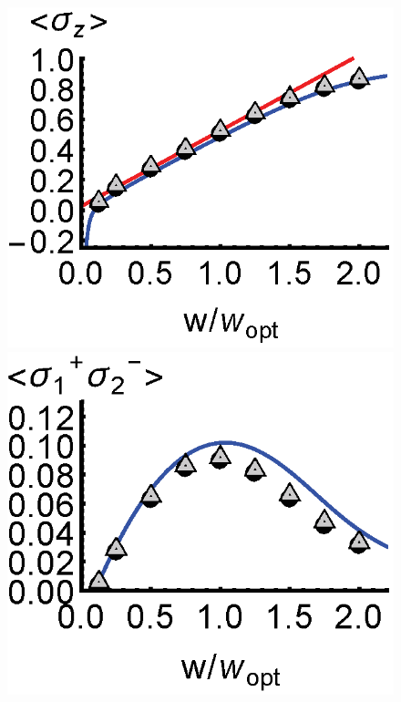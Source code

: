 \documentclass[aps,
twocolumn,
superscriptaddress,groupedaddress]{revtex4}
\begin{document}
\begin{figure}
\begin{center}
	\includegraphics[scale =0.38] {N40SuperradianceSZ.eps}
	\hspace{-5.0mm} \includegraphics[scale =0.38] {N40SuperradianceSPSM.eps}

\end{center}
\end{figure}
\end{document}
